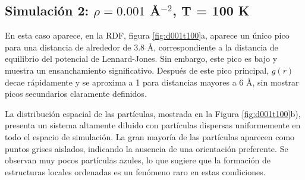 \subsection{Simulación 2: $\rho = 0.001$ \AA$^{-2}$, T = 100 K}

En esta caso aparece, en la RDF, figura \ref{fig:d001t100}a, aparece un único pico para una distancia de alrededor de 3.8 \AA, correspondiente a la distancia de equilibrio del potencial de Lennard-Jones. Sin embargo, este pico es bajo y muestra un ensanchamiento significativo. Después de este pico principal, $g(r)$ decae rápidamente y se aproxima a 1 para distancias mayores a 6 \AA, sin mostrar picos secundarios claramente definidos.

\vspace{\baselineskip}
	
La distribución espacial de las partículas, mostrada en la Figura \ref{fig:d001t100}b), presenta un sistema altamente diluido con partículas dispersas uniformemente en todo el espacio de simulación. La gran mayoría de las partículas aparecen como puntos grises aislados, indicando la ausencia de una orientación preferente. Se observan muy pocos partículas azules, lo que sugiere que la formación de estructuras locales ordenadas es un fenómeno raro en estas condiciones.

